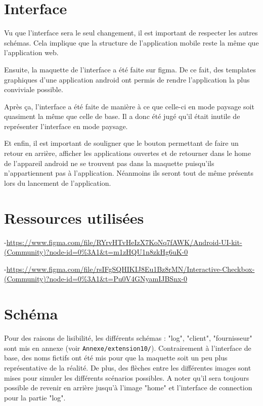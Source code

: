 \section{Interface}
\begin{flushleft}
Vu que l'interface sera le seul changement, il est important de respecter les autres schémas. Cela implique que la structure de l'application mobile reste la même que l'application web.
\end{flushleft}
\begin{flushleft}
Ensuite, la maquette de l'interface a été faite sur figma. De ce fait, des templates graphiques d'une application android ont permis de rendre l'application la plus conviviale possible.
\end{flushleft}
\begin{flushleft}
Après ça, l'interface a été faite de manière à ce que celle-ci en mode paysage soit quasiment la même que celle de base. Il a donc été jugé qu'il était inutile de représenter l'interface en mode paysage. 
\end{flushleft}
\begin{flushleft}
Et enfin, il est important de souligner que le bouton permettant de faire un retour en arrière, afficher les applications ouvertes et de retourner dans le home de l'appareil android ne se trouvent pas dans la maquette puisqu'ils n'appartiennent pas à l'application. Néanmoins ils seront tout de même présents lors du lancement de l'application.
\end{flushleft}
\newpage
\section{Ressources utilisées}
\begin{flushleft}
-\url{https://www.figma.com/file/RYrvHTvHeIzX7KoNq7fAWK/Android-UI-kit-(Community)?node-id=0\%3A1&t=m1zHQU1n8zkHg6uK-0}
\end{flushleft}
\begin{flushleft}
-\url{https://www.figma.com/file/rsIFgSQHIKIJ8Eu1Bz8rMN/Interactive-Checkbox-(Community)?node-id=0\%3A1&t=Pu0V4GNyamIJBSnx-0}
\end{flushleft}
\section{Schéma}
\begin{flushleft}
Pour des raisons de lisibilité, les différents schémas : "log", "client", "fournisseur" sont mis en annexe (voir \texttt{Annexe/extension10/}). Contrairement à l'interface de base, des noms fictifs ont été mis pour que la maquette soit un peu plus représentative de la réalité. De plus, des flèches entre les différentes images sont mises pour simuler les différents scénarios possibles. A noter qu'il sera toujours possible de revenir en arrière jusqu'à l'image "home" et l'interface de connection pour la partie "log".
\end{flushleft}
